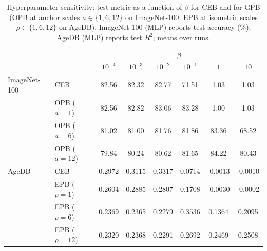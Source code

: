 \begin{table}[t]
\centering
\caption{Hyperparameter sensitivity: test metric as a function of $\beta$ for CEB and for GPB (OPB at anchor scales $a\in\{1,6,12\}$ on ImageNet-100; EPB at isometric scales $\rho\in\{1,6,12\}$ on AgeDB). ImageNet-100 (MLP) reports test accuracy (\%); AgeDB (MLP) reports test $R^2$; means over runs.}
\label{tab:compression}
\small
{
\setlength{\tabcolsep}{4pt}
\begin{tabular}{l l c c c c c c}
\hline
 & & \multicolumn{6}{c}{$\beta$} \\
 & & $10^{-4}$ & $10^{-3}$ & $10^{-2}$ & $10^{-1}$ & $1$ & $10$ \\
\hline
ImageNet-100 & CEB & 82.56 & 82.32 & 82.77 & 71.51 & 1.03 & 1.03 \\
 & OPB ($a=1$) & 82.56 & 82.82 & 83.06 & 83.28 & 1.00 & 1.03 \\
 & OPB ($a=6$) & 81.02 & 81.00 & 81.76 & 81.86 & 83.36 & 68.52 \\
 & OPB ($a=12$) & 79.84 & 80.24 & 80.62 & 81.65 & 84.22 & 80.43 \\
\hline
AgeDB & CEB & 0.2972 & 0.3115 & 0.3317 & 0.0714 & -0.0013 & -0.0010 \\
 & EPB ($\rho=1$) & 0.2604 & 0.2885 & 0.2807 & 0.1708 & -0.0030 & -0.0002 \\
 & EPB ($\rho=6$) & 0.2369 & 0.2365 & 0.2279 & 0.3536 & 0.1364 & 0.2095 \\
 & EPB ($\rho=12$) & 0.2320 & 0.2368 & 0.2291 & 0.2692 & 0.2469 & 0.2508 \\
\hline
\end{tabular}
}
\end{table}

